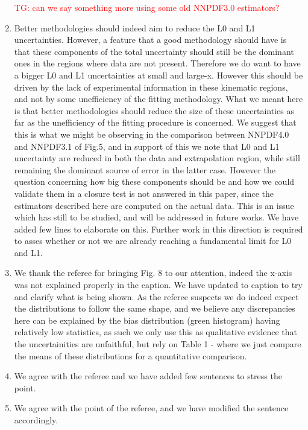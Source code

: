 \documentclass[11pt,a4paper]{article}
\numberwithin{equation}{section}
\numberwithin{figure}{section}
\numberwithin{table}{section}
\begin{document}
\begin{enumerate}
    \textcolor{red}{TG: can we say something more using some old NNPDF3.0 estimators?}
    \item Better methodologies should indeed aim to reduce the L0 and L1 uncertainties.
    However, a feature that a good methodology should have is that these components of the total uncertainty should
    still be the dominant ones in the regions where data are not present.
    Therefore we do want to have a bigger L0 and L1 uncertainties at small and large-x.
    However this should be driven by the lack of experimental information in these kinematic regions,
    and not by some unefficiency of the fitting methodology. What we meant here is that better methodologies 
    should reduce the size of these uncertainties as far as the unefficiency of the fitting procedure
    is concerned. We suggest that this is what we might be observing in the comparison
    between NNPDF4.0 and NNPDF3.1 of Fig.5, and in support of this we note that L0 and L1 uncertainty
    are reduced in both the data and extrapolation region, while still remaining the dominant source of 
    error in the latter case.    
    However the question concerning how big these components should be and how we could validate them 
    in a closure test is not answered in this paper, since the estimators described here 
    are computed on the actual data.
    This is an issue which has still to be studied, and will be addressed in future works.
    We have added few lines to elaborate on this. Further work in this direction is required to 
    asses whether or not we are already reaching a fundamental limit for L0 and L1.
    \item We thank the referee for bringing Fig. 8 to our attention, indeed the x-axis was
    not explained properly in the caption. We have updated to caption to try and clarify what is being shown.
    As the referee suspects we do indeed expect the distributions to follow the same shape, and we believe
    any discrepancies here can be explained by the bias distribution (green histogram)
    having relatively low statistics, as such we only use this as qualitative evidence
    that the uncertainities are unfaithful, but rely on Table 1 - where we just compare the means of these
    distributions for a quantitative comparison.
    \item We agree with the referee and we have added few sentences to stress the point.
    \item We agree with the point of the referee, and we have modified the sentence accordingly.
\end{enumerate}







\end{document}

